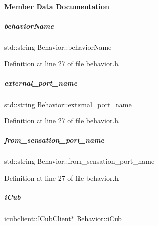 \paragraph{Member Data Documentation}
\mbox{\label{group__behaviorManager_aad9d5bf2f1f1e9c6902a4f40b03c4e67}} 
\subparagraph{\texorpdfstring{behavior\+Name}{behaviorName}}
{\footnotesize\ttfamily std\+::string Behavior\+::behavior\+Name}



Definition at line 27 of file behavior.\+h.

\mbox{\label{group__behaviorManager_abcacbd31fe67bf4dcded47b2c839128c}} 
\subparagraph{\texorpdfstring{external\+\_\+port\+\_\+name}{external\_port\_name}}
{\footnotesize\ttfamily std\+::string Behavior\+::external\+\_\+port\+\_\+name}



Definition at line 27 of file behavior.\+h.

\mbox{\label{group__behaviorManager_aad1469e84c8de8732b4ebaa7652237a7}} 
\subparagraph{\texorpdfstring{from\+\_\+sensation\+\_\+port\+\_\+name}{from\_sensation\_port\_name}}
{\footnotesize\ttfamily std\+::string Behavior\+::from\+\_\+sensation\+\_\+port\+\_\+name}



Definition at line 27 of file behavior.\+h.

\mbox{\label{group__behaviorManager_a5ab3f49bb3a40d79fe2b4aeb76e12196}} 
\subparagraph{\texorpdfstring{i\+Cub}{iCub}}
{\footnotesize\ttfamily \hyperlink{group__icubclient__clients_classicubclient_1_1ICubClient}{icubclient\+::\+I\+Cub\+Client}$\ast$ Behavior\+::i\+Cub\hspace{0.3cm}{\ttfamily [protected]}}



